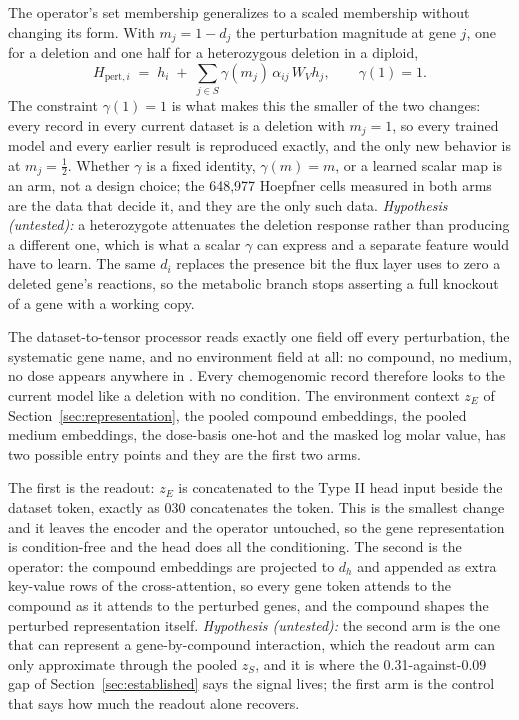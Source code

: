 The operator's set membership generalizes to a scaled membership without changing its form.
With $m_j = 1 - d_j$ the perturbation magnitude at gene $j$, one for a deletion and one half
for a heterozygous deletion in a diploid,
\[
  H_{\mathrm{pert},i} \;=\; h_i \;+\; \sum_{j \in S} \gamma(m_j)\, \alpha_{ij}\, W_V h_j ,
  \qquad \gamma(1) = 1 .
\]
The constraint $\gamma(1) = 1$ is what makes this the smaller of the two changes: every
record in every current dataset is a deletion with $m_j = 1$, so every trained model and
every earlier result is reproduced exactly, and the only new behavior is at $m_j =
\tfrac{1}{2}$. Whether $\gamma$ is a fixed identity, $\gamma(m) = m$, or a learned scalar
map is an arm, not a design choice; the 648{,}977 Hoepfner cells measured in both arms are
the data that decide it, and they are the only such data. \textit{Hypothesis (untested):} a
heterozygote attenuates the deletion response rather than producing a different one, which
is what a scalar $\gamma$ can express and a separate feature would have to learn. The same
$d_i$ replaces the presence bit the flux layer uses to zero a deleted gene's reactions, so
the metabolic branch stops asserting a full knockout of a gene with a working copy.

The dataset-to-tensor processor reads exactly one field off every perturbation, the
systematic gene name, and no environment field at all: no compound, no medium, no dose
appears anywhere in . Every chemogenomic record
therefore looks to the current model like a deletion with no condition. The environment
context $z_E$ of Section~\ref{sec:representation}, the pooled compound embeddings, the
pooled medium embeddings, the dose-basis one-hot and the masked log molar value, has two
possible entry points and they are the first two arms.

The first is the readout: $z_E$ is concatenated to the Type II head input beside the
dataset token, exactly as 030 concatenates the token. This is the smallest change and it
leaves the encoder and the operator untouched, so the gene representation is condition-free
and the head does all the conditioning. The second is the operator: the compound embeddings
are projected to $d_h$ and appended as extra key-value rows of the cross-attention, so every
gene token attends to the compound as it attends to the perturbed genes, and the compound
shapes the perturbed representation itself. \textit{Hypothesis (untested):} the second arm is
the one that can represent a gene-by-compound interaction, which the readout arm can only
approximate through the pooled $z_S$, and it is where the 0.31-against-0.09 gap of
Section~\ref{sec:established} says the signal lives; the first arm is the control that says
how much the readout alone recovers.

